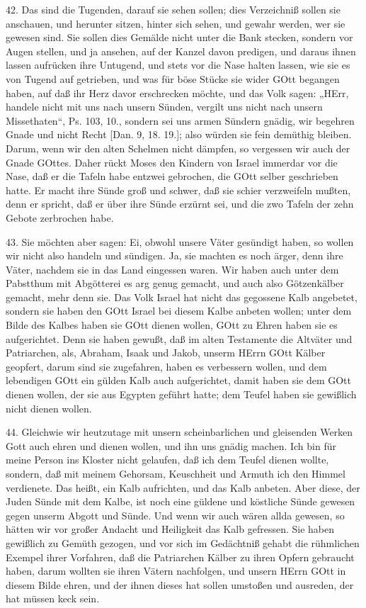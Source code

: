 42. Das sind die Tugenden, darauf sie sehen sollen; dies Verzeichniß sollen sie anschauen, und herunter sitzen, hinter sich sehen, und gewahr werden, wer sie gewesen sind. Sie sollen dies Gemälde nicht unter die Bank stecken, sondern vor Augen stellen, und ja ansehen, auf der Kanzel davon predigen, und daraus ihnen lassen aufrücken ihre Untugend, und stets vor die Nase halten lassen, wie sie es von Tugend auf getrieben, und was für böse Stücke sie wider GOtt begangen haben, auf daß ihr Herz davor erschrecken möchte, und das Volk sagen: „HErr, handele nicht mit uns nach unsern Sünden, vergilt uns nicht nach unsern Missethaten“, Ps. 103, 10., sondern sei uns armen Sündern gnädig, wir begehren Gnade und nicht Recht [Dan. 9, 18. 19.]; also würden sie fein demüthig bleiben. Darum, wenn wir den alten Schelmen nicht dämpfen, so vergessen wir auch der Gnade GOttes. Daher rückt Moses den Kindern von Israel immerdar vor die Nase, daß er die Tafeln habe entzwei gebrochen, die GOtt selber geschrieben hatte. Er macht ihre Sünde groß und schwer, daß sie schier verzweifeln mußten, denn er spricht, daß er über ihre Sünde erzürnt sei, und die zwo Tafeln der zehn Gebote zerbrochen habe.

43. Sie möchten aber sagen: Ei, obwohl unsere Väter gesündigt haben, so wollen wir nicht also handeln und sündigen. Ja, sie machten es noch ärger, denn ihre Väter, nachdem sie in das Land eingessen waren. Wir haben auch unter dem Pabstthum mit Abgötterei es arg genug gemacht, und auch also Götzenkälber gemacht, mehr denn sie. Das Volk Israel hat nicht das gegossene Kalb angebetet, sondern sie haben den GOtt Israel bei diesem Kalbe anbeten wollen; unter dem Bilde des Kalbes haben sie GOtt dienen wollen, GOtt zu Ehren haben sie es aufgerichtet. Denn sie haben gewußt, daß im alten Testamente die Altväter und Patriarchen, als, Abraham, Isaak und Jakob, unserm HErrn GOtt Kälber geopfert, darum sind sie zugefahren, haben es verbessern wollen, und dem lebendigen GOtt ein gülden Kalb auch aufgerichtet, damit haben sie dem GOtt dienen wollen, der sie aus Egypten geführt hatte; dem Teufel haben sie gewißlich nicht dienen wollen.

44. Gleichwie wir heutzutage mit unsern scheinbarlichen und gleisenden Werken Gott auch ehren und dienen wollen, und ihn uns gnädig machen. Ich bin für meine Person ins Kloster nicht gelaufen, daß ich dem Teufel dienen wollte, sondern, daß mit meinem Gehorsam, Keuschheit und Armuth ich den Himmel verdienete. Das heißt, ein Kalb aufrichten, und das Kalb anbeten. Aber diese, der Juden Sünde mit dem Kalbe, ist noch eine güldene und köstliche Sünde gewesen gegen unserm Abgott und Sünde. Und wenn wir auch wären allda gewesen, so hätten wir vor großer Andacht und Heiligkeit das Kalb gefressen. Sie haben gewißlich zu Gemüth gezogen, und vor sich im Gedächtniß gehabt die rühmlichen Exempel ihrer
Vorfahren, daß die Patriarchen Kälber zu ihren Opfern gebraucht haben, darum wollten sie ihren Vätern nachfolgen, und unsern HErrn GOtt in diesem Bilde ehren, und der ihnen dieses hat sollen umstoßen und ausreden, der hat müssen keck sein.

